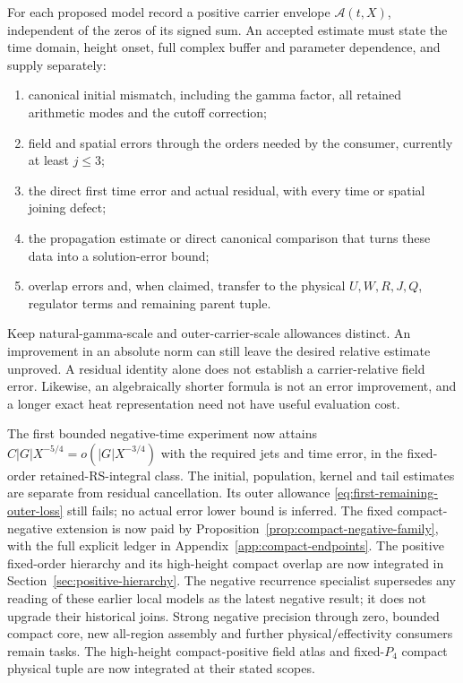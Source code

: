 \documentclass[11pt]{article}
\numberwithin{equation}{section}
\begin{document}
For each proposed model record a positive carrier envelope
\(\mathcal A(t,X)\), independent of the zeros of its signed sum.
An accepted estimate must state the time domain, height onset, full
complex buffer and parameter dependence, and supply separately:
\begin{enumerate}
\item canonical initial mismatch, including the gamma factor,
all retained arithmetic modes and the cutoff correction;
\item field and spatial errors through the orders needed by the
consumer, currently at least \(j\le3\);
\item the direct first time error and actual residual, with every
time or spatial joining defect;
\item the propagation estimate or direct canonical comparison that
turns these data into a solution-error bound;
\item overlap errors and, when claimed, transfer to the physical
\(U,W,R,J,Q\), regulator terms and remaining parent tuple.
\end{enumerate}
Keep natural-gamma-scale and outer-carrier-scale allowances distinct.
An improvement in an absolute norm can still leave the desired
relative estimate unproved. A residual identity alone does not
establish a carrier-relative field error. Likewise, an algebraically
shorter formula is not an error improvement, and a longer exact heat
representation need not have useful evaluation cost.

The first bounded negative-time experiment now attains
\(C|G|X^{-5/4}=o(|G|X^{-3/4})\) with the required jets and time
error, in the fixed-order retained-RS-integral class. The initial,
population, kernel and tail estimates are separate from residual
cancellation. Its outer allowance \eqref{eq:first-remaining-outer-loss}
still fails; no actual error lower bound is inferred. The fixed
compact-negative extension is now paid by
Proposition~\ref{prop:compact-negative-family}, with the full explicit
ledger in Appendix~\ref{app:compact-endpoints}. The positive fixed-order hierarchy and its high-height compact
overlap are now integrated in Section~\ref{sec:positive-hierarchy}.
The negative recurrence specialist \cite{recurrence} supersedes any
reading of these earlier local models as the latest negative result;
it does not upgrade their historical joins. Strong negative precision through zero, bounded compact core, new
all-region assembly and further physical/effectivity consumers remain
tasks. The high-height compact-positive field atlas and fixed-$P_4$
compact physical tuple are now integrated at their stated scopes.
\end{document}
